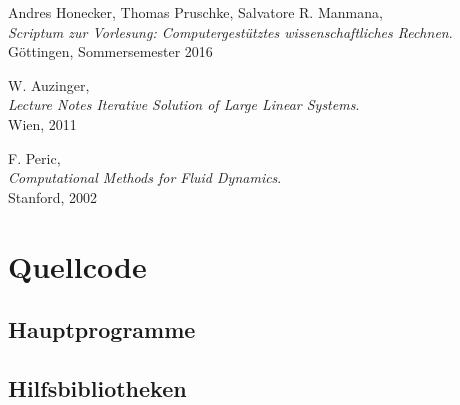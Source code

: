 \documentclass[12pt,a4paper,titlepage,headinclude,bibtotoc]{scrartcl}
\begin{document}
\begin{thebibliography}{9}
  Andres Honecker, Thomas Pruschke, Salvatore R. Manmana, \\
  \emph{Scriptum zur Vorlesung: Computergestütztes wissenschaftliches Rechnen}. \\
 Göttingen,
  Sommersemester 2016

  W. Auzinger, \\
  \emph{Lecture Notes Iterative Solution of Large Linear Systems}. \\
 Wien, 2011
 
  F. Peric, \\
  \emph{Computational Methods for Fluid Dynamics}. \\
 Stanford, 2002
 
 
 
 \end{thebibliography}
\clearpage

\clearpage

\appendix
\section{Quellcode}
\subsection{Hauptprogramme}
\label{sec:source_main} 



\clearpage

\subsection{Hilfsbibliotheken}
\label{sec:source_lib} 






\end{document}
